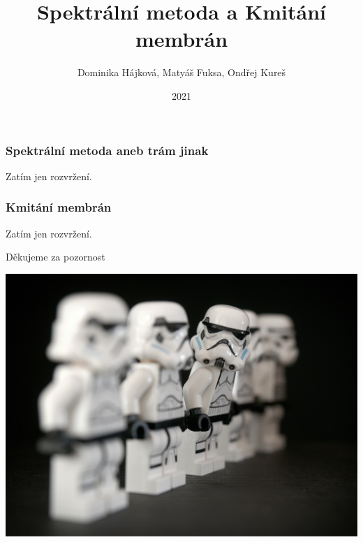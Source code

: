 \documentclass{beamer}
\title{Spektrální metoda a Kmitání membrán}
\author{Dominika Hájková, Matyáš Fuksa, Ondřej Kureš}
\institute{Stormtrooperz}
\date{2021}
\begin{document}
\frame{\titlepage}

\begin{frame}
\frametitle{Spektrální metoda aneb trám jinak}
Zatím jen rozvržení.
\end{frame}
\begin{frame}
\frametitle{Kmitání membrán}
Zatím jen rozvržení.
\end{frame}


\begin{frame}
\begin{center}
\begin{huge}
Děkujeme za pozornost
\end{huge}
  \centering
  \includegraphics[width=.8\linewidth]{stormtroop.jpg}
\end{center}

\end{frame}
\end{document}
